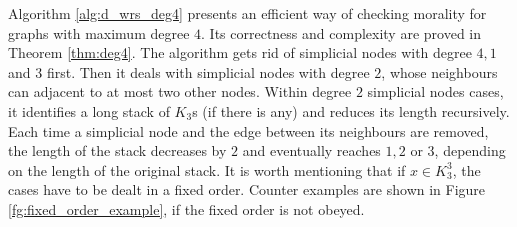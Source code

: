 Algorithm \ref{alg:d_wrs_deg4} presents an efficient way of checking morality for graphs with maximum degree $4$. Its correctness and complexity are proved in Theorem \ref{thm:deg4}. The algorithm gets rid of simplicial nodes with degree $4,1$ and $3$ first. Then it deals with simplicial nodes with degree $2$, whose neighbours can adjacent to at most two other nodes. Within degree $2$ simplicial nodes cases, it identifies a long stack of $K_3$s (if there is any) and reduces its length recursively. Each time a simplicial node and the edge between its neighbours are removed, the length of the stack decreases by $2$ and eventually reaches $1,2$ or $3$, depending on the length of the original stack. It is worth mentioning that if $x \in K_3^3$, the cases have to be dealt in a fixed order. Counter examples are shown in Figure \ref{fg:fixed_order_example}, if the fixed order is not obeyed. 

